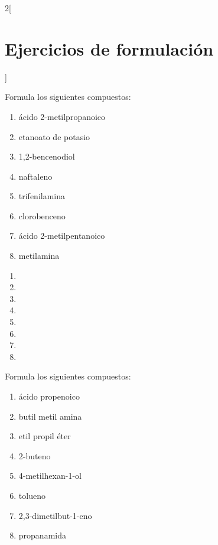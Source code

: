 \documentclass[10pt]{article}
\begin{document}
\begin{multicols*}{2}[
  \section{Ejercicios de formulación}
  ]

\begin{exercise}[
    tags    = {orgánica,nomenclatura,múltiple,2B},
    topics  = {química orgánica,formulación,nomenclatura},
    source  = {Química 2B SAN 2016, p391, e17},
  ]
  Formula los siguientes compuestos:

  \begin{enumerate}
    \item ácido 2-metilpropanoico
    \item etanoato de potasio
    \item 1,2-bencenodiol
    \item naftaleno
    \item trifenilamina
    \item clorobenceno
    \item ácido 2-metilpentanoico
    \item metilamina
  \end{enumerate}
\end{exercise}

\begin{solution}
  \begin{enumerate}
    \item {}
    \item {}
    \item {}
    \item {}
    \item {}
    \item {}
    \item {}
    \item {}
  \end{enumerate}
\end{solution}


\begin{exercise}[
    tags    = {orgánica,nomenclatura,múltiple,2B},
    topics  = {química orgánica,formulación,nomenclatura},
    source  = {Química 2B SAN 2016, p391, e17},
  ]
  Formula los siguientes compuestos:

  \begin{enumerate}
    \item ácido propenoico
    \item butil metil amina
    \item etil propil éter
    \item 2-buteno
    \item 4-metilhexan-1-ol
    \item tolueno
    \item 2,3-dimetilbut-1-eno
    \item propanamida
  \end{enumerate}
\end{exercise}


\end{multicols*}
\end{document}

